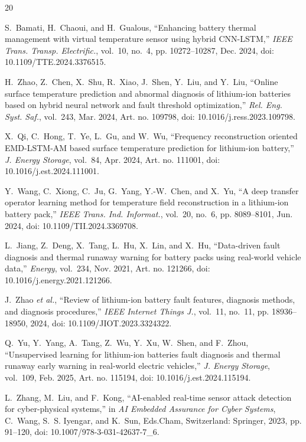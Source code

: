 \documentclass[conference]{IEEEtran}
\begin{document}
\begin{thebibliography}{20}

S.~Bamati, H.~Chaoui, and H.~Gualous, ``Enhancing battery thermal management with virtual temperature sensor using hybrid CNN-LSTM,'' \emph{IEEE Trans. Transp. Electrific.}, vol.~10, no.~4, pp. 10272--10287, Dec. 2024, doi: 10.1109/TTE.2024.3376515.

H.~Zhao, Z.~Chen, X.~Shu, R.~Xiao, J.~Shen, Y.~Liu, and Y.~Liu, ``Online surface temperature prediction and abnormal diagnosis of lithium-ion batteries based on hybrid neural network and fault threshold optimization,'' \emph{Rel. Eng. Syst. Saf.}, vol.~243, Mar. 2024, Art. no. 109798, doi: 10.1016/j.ress.2023.109798.

X.~Qi, C.~Hong, T.~Ye, L.~Gu, and W.~Wu, ``Frequency reconstruction oriented EMD-LSTM-AM based surface temperature prediction for lithium-ion battery,'' \emph{J. Energy Storage}, vol.~84, Apr. 2024, Art. no. 111001, doi: 10.1016/j.est.2024.111001.

Y.~Wang, C.~Xiong, C.~Ju, G.~Yang, Y.-W.~Chen, and X.~Yu, ``A deep transfer operator learning method for temperature field reconstruction in a lithium-ion battery pack,'' \emph{IEEE Trans. Ind. Informat.}, vol.~20, no.~6, pp. 8089--8101, Jun. 2024, doi: 10.1109/TII.2024.3369708.

L.~Jiang, Z.~Deng, X.~Tang, L.~Hu, X.~Lin, and X.~Hu, ``Data-driven fault diagnosis and thermal runaway warning for battery packs using real-world vehicle data,'' \emph{Energy}, vol.~234, Nov. 2021, Art. no. 121266, doi: 10.1016/j.energy.2021.121266.

J.~Zhao \emph{et al.}, ``Review of lithium-ion battery fault features, diagnosis methods, and diagnosis procedures,'' \emph{IEEE Internet Things J.}, vol.~11, no.~11, pp. 18936--18950, 2024, doi: 10.1109/JIOT.2023.3324322.

Q.~Yu, Y.~Yang, A.~Tang, Z.~Wu, Y.~Xu, W.~Shen, and F.~Zhou, ``Unsupervised learning for lithium-ion batteries fault diagnosis and thermal runaway early warning in real-world electric vehicles,'' \emph{J. Energy Storage}, vol.~109, Feb. 2025, Art. no. 115194, doi: 10.1016/j.est.2024.115194.

L.~Zhang, M.~Liu, and F.~Kong, ``AI-enabled real-time sensor attack detection for cyber-physical systems,'' in \emph{AI Embedded Assurance for Cyber Systems}, C.~Wang, S.~S. Iyengar, and K.~Sun, Eds.\hspace{1em}Cham, Switzerland: Springer, 2023, pp. 91--120, doi: 10.1007/978-3-031-42637-7\_6.


\end{thebibliography}
\end{document}
